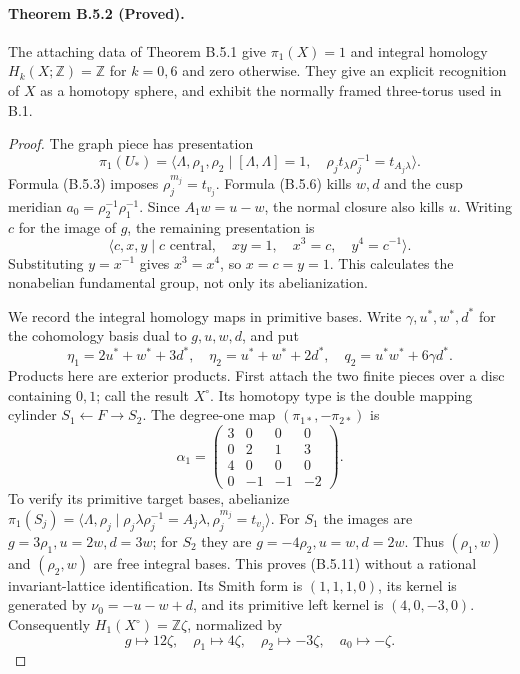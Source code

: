\paragraph{Theorem B.5.2 (Proved).}
The attaching data of Theorem B.5.1 give
$\pi_1(X)=1$ and integral homology
$H_k(X;\mathbb Z)=\mathbb Z$ for $k=0,6$ and zero
otherwise.  They give an explicit recognition of $X$
as a homotopy sphere, and exhibit the normally framed
three-torus used in B.1.

\begin{proof}
The graph piece has presentation
\[
 \pi_1(U_*)=
 \langle\Lambda,\rho_1,\rho_2\mid
 [\Lambda,\Lambda]=1,\quad
 \rho_jt_\lambda\rho_j^{-1}=t_{A_j\lambda}\rangle.
\]
Formula (B.5.3) imposes $\rho_j^{m_j}=t_{v_j}$.
Formula (B.5.6) kills $w,d$ and the cusp meridian
$a_0=\rho_2^{-1}\rho_1^{-1}$.  Since $A_1w=u-w$,
the normal closure also kills $u$.  Writing $c$ for
the image of $g$, the remaining presentation is
\[
 \langle c,x,y\mid c\text{ central},\quad
 xy=1,\quad x^3=c,\quad y^4=c^{-1}\rangle.
 \tag{B.5.9}
\]
Substituting $y=x^{-1}$ gives $x^3=x^4$, so $x=c=y=1$.
This calculates the nonabelian fundamental group,
not only its abelianization.

We record the integral homology maps in primitive
bases.  Write $\gamma,u^*,w^*,d^*$ for the cohomology
basis dual to $g,u,w,d$, and put
\[
 \eta_1=2u^*+w^*+3d^*,\quad
 \eta_2=u^*+w^*+2d^*,\quad
 q_2=u^*w^*+6\gamma d^*.
 \tag{B.5.10}
\]
Products here are exterior products.  First attach
the two finite pieces over a disc containing $0,1$;
call the result $X^\circ$.  Its homotopy type is the
double mapping cylinder $S_1\leftarrow F\to S_2$.
The degree-one
map $(\pi_{1*},-\pi_{2*})$ is
\[
 \alpha_1=
 \begin{pmatrix}
 3&0&0&0\\0&2&1&3\\4&0&0&0\\0&-1&-1&-2
 \end{pmatrix}.
 \tag{B.5.11}
\]
To verify its primitive target bases, abelianize
$\pi_1(S_j)=\langle\Lambda,\rho_j\mid
\rho_j\lambda\rho_j^{-1}=A_j\lambda,
\rho_j^{m_j}=t_{v_j}\rangle$.
For $S_1$ the images are
$g=3\rho_1,u=2w,d=3w$; for $S_2$ they are
$g=-4\rho_2,u=w,d=2w$.  Thus
$(\rho_1,w)$ and $(\rho_2,w)$ are free integral bases.
This proves (B.5.11) without a rational invariant-lattice
identification.  Its Smith form is $(1,1,1,0)$,
its kernel is generated by
$\nu_0=-u-w+d$, and its primitive left kernel is
$(4,0,-3,0)$.  Consequently
$H_1(X^\circ)=\mathbb Z\zeta$, normalized by
\[
 g\mapsto12\zeta,\quad
 \rho_1\mapsto4\zeta,\quad
 \rho_2\mapsto-3\zeta,\quad
 a_0\mapsto-\zeta.
 \tag{B.5.12}
\]


\end{proof}
